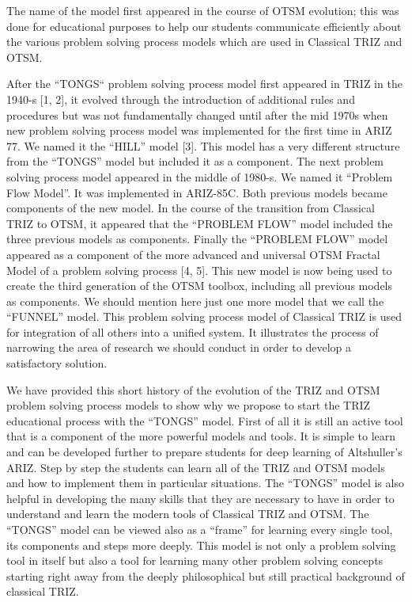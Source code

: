 \documentclass[11pt,a4paper]{article}
\begin{document}
The name of the model first appeared in the course of OTSM evolution; this was
done for educational purposes to help our students communicate efficiently
about the various problem solving process models which are used in Classical
TRIZ and OTSM.

After the “TONGS“ problem solving process model first appeared in TRIZ in the
1940-s [1, 2], it evolved through the introduction of additional rules and
procedures but was not fundamentally changed until after the mid 1970s when
new problem solving process model was implemented for the first time in ARIZ
77. We named it the “HILL” model [3]. This model has a very different
structure from the “TONGS” model but included it as a component. The next
problem solving process model appeared in the middle of 1980-s. We named it
“Problem Flow Model”. It was implemented in ARIZ-85C.  Both previous models
became components of the new model.  In the course of the transition from
Classical TRIZ to OTSM, it appeared that the “PROBLEM FLOW” model included the
three previous models as components.  Finally the “PROBLEM FLOW” model
appeared as a component of the more advanced and universal OTSM Fractal Model
of a problem solving process [4, 5].  This new model is now being used to
create the third generation of the OTSM toolbox, including all previous models
as components. We should mention here just one more model that we call the
“FUNNEL” model.  This problem solving process model of Classical TRIZ is used
for integration of all others into a unified system.  It illustrates the
process of narrowing the area of research we should conduct in order to
develop a satisfactory solution.

We have provided this short history of the evolution of the TRIZ and OTSM
problem solving process models to show why we propose to start the TRIZ
educational process with the “TONGS” model. First of all it is still an active
tool that is a component of the more powerful models and tools. It is simple
to learn and can be developed further to prepare students for deep learning of
Altshuller’s ARIZ.  Step by step the students can learn all of the TRIZ and
OTSM models and how to implement them in particular situations. The “TONGS”
model is also helpful in developing the many skills that they are necessary to
have in order to understand and learn the modern tools of Classical TRIZ and
OTSM.  The “TONGS” model can be viewed also as a “frame” for learning every
single tool, its components and steps more deeply.  This model is not only a
problem solving tool in itself but also a tool for learning many other problem
solving concepts starting right away from the deeply philosophical but still
practical background of classical TRIZ.
\end{document}

